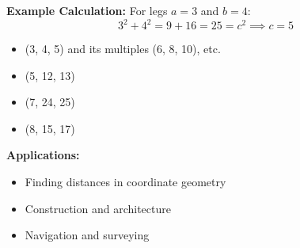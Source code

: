 \documentclass{article} %
\begin{document}
\textbf{Example Calculation:}
For legs $a = 3$ and $b = 4$:
\[
3^2 + 4^2 = 9 + 16 = 25 = c^2 \implies c = 5
\]

\begin{itemize}
    \item (3, 4, 5) and its multiples (6, 8, 10), etc.
    \item (5, 12, 13)
    \item (7, 24, 25)
    \item (8, 15, 17)
\end{itemize}

\textbf{Applications:}
\begin{itemize}
    \item Finding distances in coordinate geometry
    \item Construction and architecture
    \item Navigation and surveying
\end{itemize}
\end{document}
